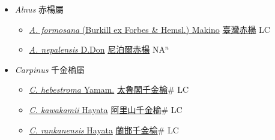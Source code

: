 
  \begin{itemize}
 \item[] \textit{Alnus} 赤楊屬
                    
  \begin{itemize}
        \item[] \href{http://www.theplantlist.org/tpl1.1/search?q=Alnus+formosana}{\textit{A. formosana} (Burkill ex Forbes \& Hemsl.) Makino}   \href{\detokenize{http://taibnet.sinica.edu.tw/chi/taibnet_species_list.php?T2=臺灣赤楊&T2_new_value=true&fr=y}}{臺灣赤楊} LC
        \item[] \href{http://www.theplantlist.org/tpl1.1/search?q=Alnus+nepalensis}{\textit{A. nepalensis} D.Don}   \href{\detokenize{http://taibnet.sinica.edu.tw/chi/taibnet_species_list.php?T2=尼泊爾赤楊&T2_new_value=true&fr=y}}{尼泊爾赤楊} NA$^n$
  \end{itemize}
 \item[] \textit{Carpinus} 千金榆屬
                    
  \begin{itemize}
        \item[] \href{http://www.theplantlist.org/tpl1.1/search?q=Carpinus+hebestroma}{\textit{C. hebestroma} Yamam.}   \href{\detokenize{http://taibnet.sinica.edu.tw/chi/taibnet_species_list.php?T2=太魯閣千金榆&T2_new_value=true&fr=y}}{太魯閣千金榆}\# LC
        \item[] \href{http://www.theplantlist.org/tpl1.1/search?q=Carpinus+kawakamii}{\textit{C. kawakamii} Hayata}   \href{\detokenize{http://taibnet.sinica.edu.tw/chi/taibnet_species_list.php?T2=阿里山千金榆&T2_new_value=true&fr=y}}{阿里山千金榆}\# LC
        \item[] \href{http://www.theplantlist.org/tpl1.1/search?q=Carpinus+rankanensis}{\textit{C. rankanensis} Hayata}   \href{\detokenize{http://taibnet.sinica.edu.tw/chi/taibnet_species_list.php?T2=蘭邯千金榆&T2_new_value=true&fr=y}}{蘭邯千金榆}\# LC
  \end{itemize}
  \end{itemize}
